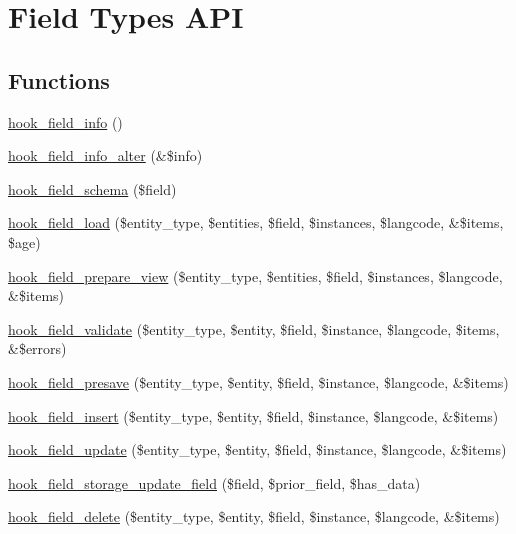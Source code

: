 \hypertarget{group__field__types}{
\section{Field Types API}
\label{group__field__types}
}
\subsection*{Functions}
\begin{DoxyCompactItemize}
\item 
\hyperlink{group__field__types_gad3eb779f26f41b520f19af011ece3eb1}{hook\_\-field\_\-info} ()
\item 
\hyperlink{group__field__types_ga62d5e308d07e62b096d13714ae42335f}{hook\_\-field\_\-info\_\-alter} (\&\$info)
\item 
\hyperlink{group__field__types_gaae7d9348e56f207a8be0b866d25252b7}{hook\_\-field\_\-schema} (\$field)
\item 
\hyperlink{group__field__types_ga37f2456e9b5b8b39dc11cffd59163c19}{hook\_\-field\_\-load} (\$entity\_\-type, \$entities, \$field, \$instances, \$langcode, \&\$items, \$age)
\item 
\hyperlink{group__field__types_ga02a3004a67ecba2b81eaa63b05d08cc8}{hook\_\-field\_\-prepare\_\-view} (\$entity\_\-type, \$entities, \$field, \$instances, \$langcode, \&\$items)
\item 
\hyperlink{group__field__types_gaa7d8846e8fe3766e1b3435cd50b965be}{hook\_\-field\_\-validate} (\$entity\_\-type, \$entity, \$field, \$instance, \$langcode, \$items, \&\$errors)
\item 
\hyperlink{group__field__types_ga5ab3a9e3c8ebccb8ca151790ec07809d}{hook\_\-field\_\-presave} (\$entity\_\-type, \$entity, \$field, \$instance, \$langcode, \&\$items)
\item 
\hyperlink{group__field__types_ga2d29ec2e4a47170d5aaaf41bdd4813df}{hook\_\-field\_\-insert} (\$entity\_\-type, \$entity, \$field, \$instance, \$langcode, \&\$items)
\item 
\hyperlink{group__field__types_gaca5bc4f8ab69818f23783af24454d9c4}{hook\_\-field\_\-update} (\$entity\_\-type, \$entity, \$field, \$instance, \$langcode, \&\$items)
\item 
\hyperlink{group__field__types_gae38c5e194a4bf43e2af3dba6b62da25b}{hook\_\-field\_\-storage\_\-update\_\-field} (\$field, \$prior\_\-field, \$has\_\-data)
\item 
\hyperlink{group__field__types_gaf1e5787044b83d34cf7daed3d5297336}{hook\_\-field\_\-delete} (\$entity\_\-type, \$entity, \$field, \$instance, \$langcode, \&\$items)

\end{DoxyCompactItemize}
